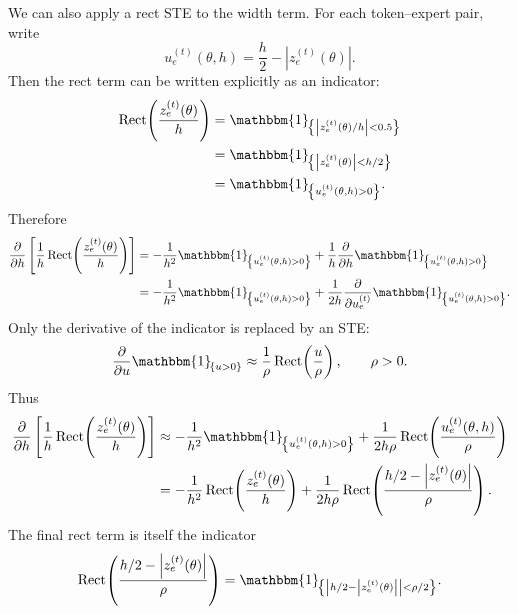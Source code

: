 \documentclass[11pt]{article}
\newcommand{\indic}[1]{\mathbbm{1}_{\!\left\{#1\right\}}}
\newcommand{\modelparams}{\theta}
\newcommand{\bandwidth}{h}
\newcommand{\rect}{\operatorname{Rect}}
\newcommand{\abs}[1]{\left\vert#1\right\vert}
\begin{document}
We can also apply a rect STE to the width term.  For each token--expert pair,
write
\[
  u_e^{(t)}(\modelparams,\bandwidth)
  =
  \frac{\bandwidth}{2}
  -
  \abs{z_e^{(t)}(\modelparams)}.
\]
Then the rect term can be written explicitly as an indicator:
\[
\begin{aligned}
  \rect\!\left(
    \frac{z_e^{(t)}(\modelparams)}{\bandwidth}
  \right)
  &=
  \indic{
    \abs{z_e^{(t)}(\modelparams) / \bandwidth}<0.5
  } \\
  &=
  \indic{
    \abs{z_e^{(t)}(\modelparams)}<\bandwidth/2
  } \\
  &=
  \indic{
    u_e^{(t)}(\modelparams,\bandwidth)>0
  }.
\end{aligned}
\]
Therefore
\[
\begin{aligned}
  \frac{\partial}{\partial\bandwidth}
  \left[
    \frac{1}{\bandwidth}
    \rect\!\left(
      \frac{z_e^{(t)}(\modelparams)}{\bandwidth}
    \right)
  \right]
  &=
  -\frac{1}{\bandwidth^2}
  \indic{
    u_e^{(t)}(\modelparams,\bandwidth)>0
  }
  +
  \frac{1}{\bandwidth}
  \frac{\partial}{\partial\bandwidth}
  \indic{
    u_e^{(t)}(\modelparams,\bandwidth)>0
  } \\
  &=
  -\frac{1}{\bandwidth^2}
  \indic{
    u_e^{(t)}(\modelparams,\bandwidth)>0
  }
  +
  \frac{1}{2\bandwidth}
  \frac{\partial}{\partial u_e^{(t)}}
  \indic{
    u_e^{(t)}(\modelparams,\bandwidth)>0
  }.
\end{aligned}
\]
Only the derivative of the indicator is replaced by an STE:
\[
  \frac{\partial}{\partial u}
  \indic{u>0}
  \approx
  \frac{1}{\rho}
  \rect\!\left(\frac{u}{\rho}\right),
  \qquad
  \rho>0.
\]
Thus
\[
\begin{aligned}
  \frac{\partial}{\partial\bandwidth}
  \left[
    \frac{1}{\bandwidth}
    \rect\!\left(
      \frac{z_e^{(t)}(\modelparams)}{\bandwidth}
    \right)
  \right]
  &\approx
  -\frac{1}{\bandwidth^2}
  \indic{
    u_e^{(t)}(\modelparams,\bandwidth)>0
  }
  +
  \frac{1}{2\bandwidth\rho}
  \rect\!\left(
    \frac{u_e^{(t)}(\modelparams,\bandwidth)}{\rho}
  \right) \\
  &=
  -\frac{1}{\bandwidth^2}
  \rect\!\left(
    \frac{z_e^{(t)}(\modelparams)}{\bandwidth}
  \right)
  +
  \frac{1}{2\bandwidth\rho}
  \rect\!\left(
    \frac{\bandwidth/2-\abs{z_e^{(t)}(\modelparams)}}{\rho}
  \right).
\end{aligned}
\]
The final rect term is itself the indicator
\[
  \rect\!\left(
    \frac{\bandwidth/2-\abs{z_e^{(t)}(\modelparams)}}{\rho}
  \right)
  =
  \indic{
    \abs{\bandwidth/2-\abs{z_e^{(t)}(\modelparams)}}<\rho/2
  }.
\]
\end{document}
